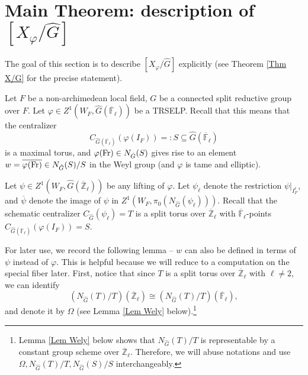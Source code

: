 \section{Main Theorem: description of $[X_{\varphi}/\hat{G}]$}\label{Section X/hatG}

The goal of this section is to describe $[X_{\varphi}/\hat{G}]$ explicitly (see Theorem \ref{Thm X/G} for the precise statement).

Let $F$ be a non-archimedean local field, $G$ be a connected split reductive group over $F$. Let $\varphi \in Z^1(W_F, \hat{G}(\overline{\mathbb{F}}_{\ell}))$ be a TRSELP. Recall that this means that the centralizer 
$$C_{\hat{G}(\overline{\mathbb{F}}_{\ell})}(\varphi(I_F)) =: S \subseteq \hat{G}(\overline{\mathbb{F}}_{\ell})$$ 
is a maximal torus, and $\varphi(\operatorname{Fr}) \in N_{\hat{G}}(S)$ gives rise to an element $w=\overline{\varphi(\operatorname{Fr})} \in N_{\hat{G}}(S)/S$ in the Weyl group (and $\varphi$ is tame and elliptic). 


Let $\psi \in Z^1(W_F, \hat{G}(\overline{\mathbb{Z}}_{\ell}))$ be any lifting of $\varphi$. Let $\psi_{\ell}$ denote the restriction $\psi|_{I_F^{\ell}}$, and $\overline{\psi}$ denote the image of $\psi$ in $Z^1(W_F, \pi_0(N_{\hat{G}}(\psi_{\ell})))$. Recall that the schematic centralizer $C_{\hat{G}}(\psi_{\ell})=T$ is a split torus over $\overline{\mathbb{Z}}_{\ell}$ with $\overline{\mathbb{F}}_{\ell}$-points $C_{\hat{G}(\overline{\mathbb{F}}_{\ell})}(\varphi(I_F)) = S$. 

For later use, we record the following lemma -- $w$ can also be defined in terms of $\psi$ instead of $\varphi$. This is helpful because we will reduce to a computation on the special fiber later. First, notice that since $T$ is a split torus over $\overline{\mathbb{Z}}_{\ell}$ with $\ell \neq 2$, we can identify
$$\left(N_{\hat{G}}(T)/T\right)(\overline{\mathbb{Z}}_{\ell}) \cong \left(N_{\hat{G}}(T)/T\right)(\overline{\mathbb{F}}_{\ell}),$$
and denote it by $\Omega$ (see Lemma \ref{Lem Wely} below).\footnote{Lemma \ref{Lem Wely} below shows that $N_{\hat{G}}(T)/T$ is representable by a constant group scheme over $\overline{\mathbb{Z}}_{\ell}$. Therefore, we will abuse notations and use 
	$\Omega, N_{\hat{G}}(T)/T, N_{\hat{G}}(S)/S$
	interchangeably.}


